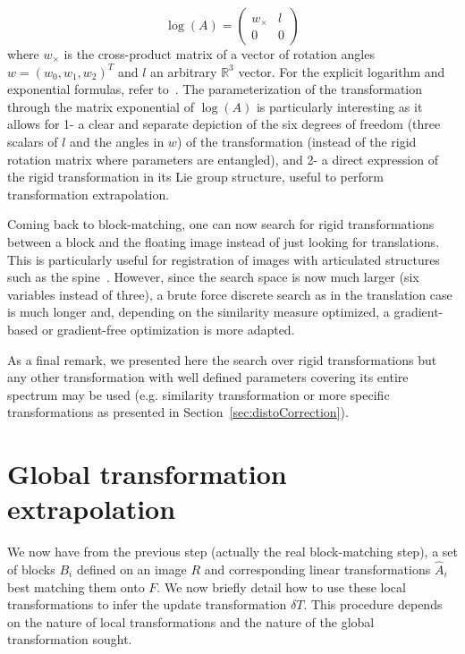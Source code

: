 \begin{equation}
	\log(A) = \begin{pmatrix} w_{\times} & l \\ 0 & 0 \end{pmatrix}
\end{equation}
where $w_{\times}$ is the cross-product matrix of a vector of rotation angles $w = (w_0,w_1,w_2)^T$ and $l$ an arbitrary $\mathbb{R}^3$ vector. For the explicit logarithm and exponential formulas, refer to~\cite{blanco2010tutorial}. The parameterization of the transformation through the matrix exponential of $\log(A)$ is particularly interesting as it allows for 1- a clear and separate depiction of the six degrees of freedom (three scalars of $l$ and the angles in $w$) of the transformation (instead of the rigid rotation matrix where parameters are entangled), and 2- a direct expression of the rigid transformation in its Lie group structure, useful to perform transformation extrapolation.

Coming back to block-matching, one can now search for rigid transformations between a block and the floating image instead of just looking for translations. This is particularly useful for registration of images with articulated structures such as the spine~\cite{Commowick_Miccai_2012}. However, since the search space is now much larger (six variables instead of three), a brute force discrete search as in the translation case is much longer and, depending on the similarity measure optimized, a gradient-based or gradient-free optimization is more adapted.

As a final remark, we presented here the search over rigid transformations but any other transformation with well defined parameters covering its entire spectrum may be used (e.g. similarity transformation or more specific transformations as presented in Section~\ref{sec:distoCorrection}).

\section{Global transformation extrapolation}

We now have from the previous step (actually the real block-matching step), a set of blocks $B_i$ defined on an image $R$ and corresponding linear transformations $\hat{A}_i$ best matching them onto $F$. We now briefly detail how to use these local transformations to infer the update transformation $\delta T$. This procedure depends on the nature of local transformations and the nature of the global transformation sought.

